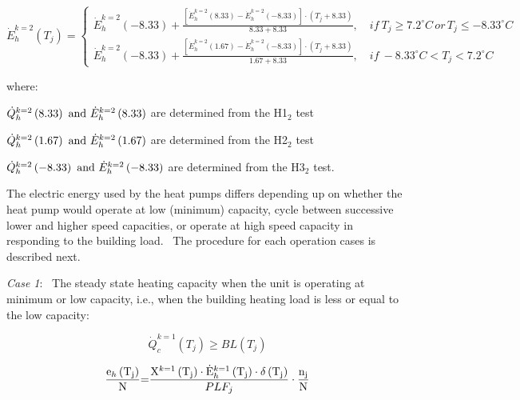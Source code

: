 \begin{equation}
\dot E_h^{k = 2}({T_j}) = \left\{ \begin{array}{l}\dot E_h^{k = 2}( - 8.33) + \frac{{\left[ {\dot E_h^{k = 2}(8.33) - \dot E_h^{k = 2}( - 8.33)} \right] \cdot \left( {{T_j} + 8.33} \right)}}{{8.33 + 8.33}},\quad if~{T_j} \ge 7.2^\circ C\,or\,{T_j} \le  - 8.33^\circ C\\\dot E_h^{k = 2}( - 8.33) + \frac{{\left[ {\dot E_h^{k = 2}(1.67) - \dot E_h^{k = 2}( - 8.33)} \right] \cdot \left( {{T_j} + 8.33} \right)}}{{1.67 + 8.33}},\quad if~ - 8.33^\circ C < {T_j} < 7.2^\circ C\end{array} \right.
\end{equation}

where:

\(\dot Q_h^{k = 2}\left( {{\rm{8}}{\rm{.33}}} \right) {\rm{~and~}} \dot E_h^{k = 2}\left( {{\rm{8}}{\rm{.33}}} \right)\) are determined from the H1\(_{2}\) test

\(\dot Q_h^{k = 2}\left( {{\rm{1}}{\rm{.67}}} \right) {\rm{~and~}} \dot E_h^{k = 2}\left( {{\rm{1}}{\rm{.67}}} \right)\) are determined from the H2\(_{2}\) test

\(\dot Q_h^{k = 2}\left( {{\rm{ - 8}}{\rm{.33}}} \right) {\rm{~and~}} \dot E_h^{k = 2}\left( {{\rm{ - 8}}{\rm{.33}}} \right)\) are determined from the H3\(_{2}\) test.

The electric energy used by the heat pumps differs depending up on whether the heat pump would operate at low (minimum) capacity, cycle between successive lower and higher speed capacities, or operate at high speed capacity in responding to the building load.~ The procedure for each operation cases is described next.

\emph{Case 1}:~ The steady state heating capacity when the unit is operating at minimum or low capacity, i.e., when the building heating load is less or equal to the low capacity:

\begin{equation}
\dot Q_c^{k = 1}\left( {{T_j}} \right) \ge BL\left( {{T_j}} \right)
\end{equation}

\begin{equation}
\frac{{{{\rm{e}}_h}\left( {{{\rm{T}}_{\rm{j}}}} \right)}}{{\rm{N}}}{\rm{ = }}\frac{{{{\rm{X}}^{k = 1}}\left( {{{\rm{T}}_{\rm{j}}}} \right) \cdot {\rm{\dot E}}_h^{k = 1}\left( {{{\rm{T}}_{\rm{j}}}} \right) \cdot {\rm{\delta }}\left( {{{\rm{T}}_{\rm{j}}}} \right)}}{{PL{F_j}}} \cdot \frac{{{{\rm{n}}_{\rm{j}}}}}{{\rm{N}}}
\end{equation}

